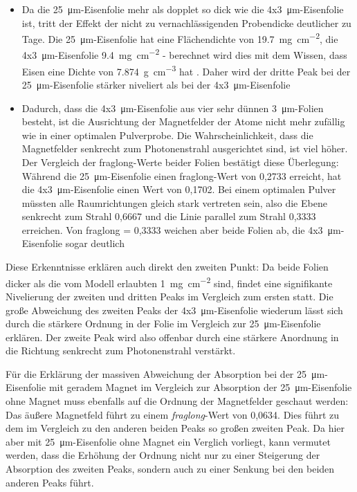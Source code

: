 \documentclass[german, %
parskip=full, %
bibliography=totoc, %
]{scrartcl}
\begin{document}
\begin{itemize}
\item Da die \SI{25}{\micro\meter}-Eisenfolie mehr als dopplet so dick wie die 4x\SI{3}{\micro\meter}-Eisenfolie ist, tritt der Effekt der nicht zu vernachlässigenden Probendicke deutlicher zu Tage. Die \SI{25}{\micro\meter}-Eisenfolie hat eine Flächendichte von \SI{19.7}{\milli\gram\per\square\centi\meter}, die 4x\SI{3}{\micro\meter}-Eisenfolie \SI{9.4}{\milli\gram\per\square\centi\meter} - berechnet wird dies mit dem Wissen, dass Eisen eine Dichte von \SI{7.874}{\gram\per\cubic\centi\meter} hat \cite{eisen}. Daher wird der dritte Peak bei der \SI{25}{\micro\meter}-Eisenfolie stärker niveliert als bei der 4x\SI{3}{\micro\meter}-Eisenfolie
\item Dadurch, dass die 4x\SI{3}{\micro\meter}-Eisenfolie aus vier sehr dünnen \SI{3}{\micro\meter}-Folien besteht, ist die Ausrichtung der Magnetfelder der Atome nicht mehr zufällig wie in einer optimalen Pulverprobe. Die Wahrscheinlichkeit, dass die Magnetfelder senkrecht zum Photonenstrahl ausgerichtet sind, ist viel höher. Der Vergleich der fraglong-Werte beider Folien bestätigt diese Überlegung: Während die \SI{25}{\micro\meter}-Eisenfolie einen fraglong-Wert von 0,2733 erreicht, hat die 4x\SI{3}{\micro\meter}-Eisenfolie einen Wert von 0,1702. Bei einem optimalen Pulver müssten alle Raumrichtungen gleich stark vertreten sein, also die Ebene senkrecht zum Strahl 0,6667 und die Linie parallel zum Strahl 0,3333 erreichen. Von fraglong = 0,3333 weichen aber beide Folien ab, die 4x\SI{3}{\micro\meter}-Eisenfolie sogar deutlich
\end{itemize}
Diese Erkenntnisse erklären auch direkt den zweiten Punkt: Da beide Folien dicker als die vom Modell erlaubten \SI{1}{\milli\gram\per\square\centi\meter} sind, findet eine signifikante Nivelierung der zweiten und dritten Peaks im Vergleich zum ersten statt. Die große Abweichung des zweiten Peaks der 4x\SI{3}{\micro\meter}-Eisenfolie wiederum lässt sich durch die stärkere Ordnung in der Folie im Vergleich zur \SI{25}{\micro\meter}-Eisenfolie erklären. Der zweite Peak wird also offenbar durch eine stärkere Anordnung in die Richtung senkrecht zum Photonenstrahl verstärkt.

Für die Erklärung der massiven Abweichung der Absorption bei der \SI{25}{\micro\meter}-Eisenfolie mit geradem Magnet im Vergleich zur Absorption der \SI{25}{\micro\meter}-Eisenfolie ohne Magnet muss ebenfalls auf die Ordnung der Magnetfelder geschaut werden: Das äußere Magnetfeld führt zu einem \textit{fraglong}-Wert von 0,0634. Dies führt zu dem im Vergleich zu den anderen beiden Peaks so großen zweiten Peak. Da hier aber mit \SI{25}{\micro\meter}-Eisenfolie ohne Magnet ein Verglich vorliegt, kann vermutet werden, dass die Erhöhung der Ordnung nicht nur zu einer Steigerung der Absorption des zweiten Peaks, sondern auch zu einer Senkung bei den beiden anderen Peaks führt.
\end{document}
